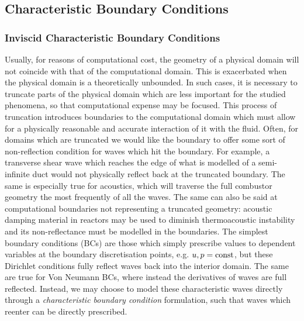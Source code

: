 \subsection{Characteristic Boundary Conditions}

\subsubsection{Inviscid Characteristic Boundary Conditions}

Usually, for reasons of computational cost, the geometry of a physical domain will not coincide with that of the computational domain. This is exacerbated when the physical domain is a theoretically unbounded. In such cases, it is necessary to truncate parts of the physical domain which are less important for the studied phenomena, so that computational expense may be focused. This process of truncation introduces boundaries to the computational domain which must allow for a physically reasonable and accurate interaction of it with the fluid. Often, for domains which are truncated we would like the boundary to offer some sort of non-reflection condition for waves which hit the boundary. For example, a transverse shear wave which reaches the edge of what is modelled of a semi-infinite duct would not physically reflect back at the truncated boundary. The same is especially true for acoustics, which will traverse the full combustor geometry the most frequently of all the waves. The same can also be said at computational boundaries not representing a truncated geometry: acoustic damping material in reactors may be used to diminish thermoacoustic instability and its non-reflectance must be modelled in the boundaries. The simplest boundary conditions (BCs) are those which simply prescribe values to dependent variables at the boundary discretisation points, e.g. $u, p = \rm {const}$, but these Dirichlet conditions fully reflect waves back into the interior domain. The same are true for Von Neumann BCs, where instead the derivatives of waves are full reflected. Instead, we may choose to model these characteristic waves directly through a \emph{characteristic boundary condition} formulation, such that waves which reenter can be directly prescribed.


